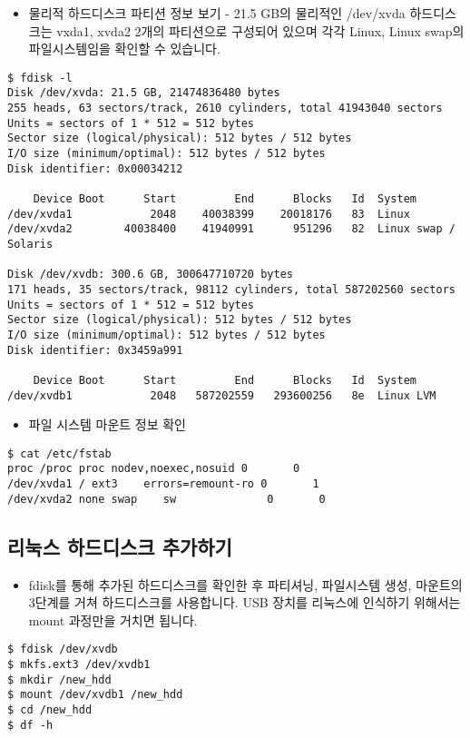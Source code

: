 \documentclass{article}
\begin{document}
\begin{itemize}
\item
  \begin{itemize}
  물리적 하드디스크 파티션 정보 보기 - 21.5 GB의 물리적인 /dev/xvda 하드디스크는 vxda1, xvda2 2개의 파티션으로 구성되어 있으며 각각 Linux, Linux swap의 파일시스템임을 확인할 수 있습니다.
  \end{itemize}
\end{itemize}
\begin{lstlisting}[frame=single,style=Bash,xleftmargin=1.4cm,xrightmargin=1.4cm]
$ fdisk -l
Disk /dev/xvda: 21.5 GB, 21474836480 bytes
255 heads, 63 sectors/track, 2610 cylinders, total 41943040 sectors
Units = sectors of 1 * 512 = 512 bytes
Sector size (logical/physical): 512 bytes / 512 bytes
I/O size (minimum/optimal): 512 bytes / 512 bytes
Disk identifier: 0x00034212

    Device Boot      Start         End      Blocks   Id  System
/dev/xvda1            2048    40038399    20018176   83  Linux
/dev/xvda2        40038400    41940991      951296   82  Linux swap / Solaris

Disk /dev/xvdb: 300.6 GB, 300647710720 bytes
171 heads, 35 sectors/track, 98112 cylinders, total 587202560 sectors
Units = sectors of 1 * 512 = 512 bytes
Sector size (logical/physical): 512 bytes / 512 bytes
I/O size (minimum/optimal): 512 bytes / 512 bytes
Disk identifier: 0x3459a991

    Device Boot      Start         End      Blocks   Id  System
/dev/xvdb1            2048   587202559   293600256   8e  Linux LVM
\end{lstlisting}

\begin{itemize}
\item
  \begin{itemize}
  파일 시스템 마운트 정보 확인  
  \end{itemize}
\end{itemize}
\begin{lstlisting}[frame=single,style=Bash,xleftmargin=1.4cm,xrightmargin=1.4cm]
$ cat /etc/fstab
proc /proc proc nodev,noexec,nosuid 0       0
/dev/xvda1 / ext3    errors=remount-ro 0       1
/dev/xvda2 none swap    sw              0       0
\end{lstlisting}

\subsection{리눅스 하드디스크 추가하기}
\begin{itemize}
\item
  \begin{itemize}
  fdisk를 통해 추가된 하드디스크를 확인한 후 파티셔닝, 파일시스템 생성, 마운트의 3단계를 거쳐 하드디스크를 사용합니다. USB 장치를 리눅스에 인식하기 위해서는 mount 과정만을 거치면 됩니다.
  \end{itemize}
\end{itemize}
\begin{lstlisting}[frame=single,style=Bash,xleftmargin=1.4cm,xrightmargin=1.4cm]
$ fdisk /dev/xvdb
$ mkfs.ext3 /dev/xvdb1
$ mkdir /new_hdd
$ mount /dev/xvdb1 /new_hdd
$ cd /new_hdd
$ df -h
\end{lstlisting}
\end{document}

